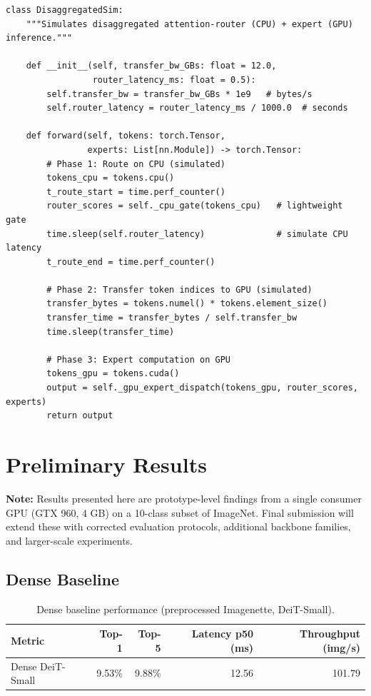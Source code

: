 \documentclass[12pt,a4paper]{article}
\begin{document}
\begin{lstlisting}[caption={DisaggregatedSim forward pass (excerpt).},label={lst:disagg}]
class DisaggregatedSim:
    """Simulates disaggregated attention-router (CPU) + expert (GPU) inference."""

    def __init__(self, transfer_bw_GBs: float = 12.0,
                 router_latency_ms: float = 0.5):
        self.transfer_bw = transfer_bw_GBs * 1e9   # bytes/s
        self.router_latency = router_latency_ms / 1000.0  # seconds

    def forward(self, tokens: torch.Tensor,
                experts: List[nn.Module]) -> torch.Tensor:
        # Phase 1: Route on CPU (simulated)
        tokens_cpu = tokens.cpu()
        t_route_start = time.perf_counter()
        router_scores = self._cpu_gate(tokens_cpu)   # lightweight gate
        time.sleep(self.router_latency)              # simulate CPU latency
        t_route_end = time.perf_counter()

        # Phase 2: Transfer token indices to GPU (simulated)
        transfer_bytes = tokens.numel() * tokens.element_size()
        transfer_time = transfer_bytes / self.transfer_bw
        time.sleep(transfer_time)

        # Phase 3: Expert computation on GPU
        tokens_gpu = tokens.cuda()
        output = self._gpu_expert_dispatch(tokens_gpu, router_scores, experts)
        return output
\end{lstlisting}

\section{Preliminary Results}
\label{sec:results}

\textbf{Note:} Results presented here are prototype-level findings from a single consumer GPU (GTX 960, 4 GB) on a 10-class subset of ImageNet. Final submission will extend these with corrected evaluation protocols, additional backbone families, and larger-scale experiments.

\subsection{Dense Baseline}

\begin{table}[H]
\centering
\caption{Dense baseline performance (preprocessed Imagenette, DeiT-Small).}
\label{tab:dense}
\begin{tabular}{lrrrr}
\toprule
\textbf{Metric} & \textbf{Top-1} & \textbf{Top-5} & \textbf{Latency p50 (ms)} & \textbf{Throughput (img/s)} \\
\midrule
Dense DeiT-Small & 9.53\% & 9.88\% & 12.56 & 101.79 \\
\bottomrule
\end{tabular}
\end{table}
\end{document}
